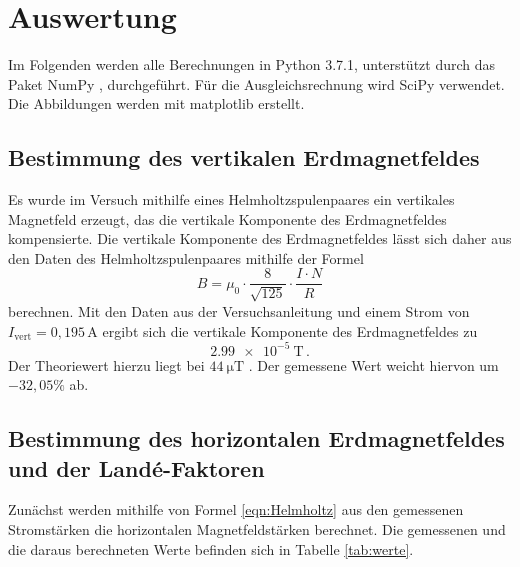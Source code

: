 \newpage
\section{Auswertung}
\label{sec:Auswertung}
Im Folgenden werden alle Berechnungen in Python 3.7.1, unterstützt durch das
Paket NumPy \cite{numpy}, durchgeführt. Für die Ausgleichsrechnung wird SciPy
\cite{scipy} verwendet. Die Abbildungen werden mit matplotlib \cite{matplotlib} erstellt.

\subsection{Bestimmung des vertikalen Erdmagnetfeldes}
\label{subsec:vertikal}

Es wurde im Versuch mithilfe eines Helmholtzspulenpaares ein vertikales Magnetfeld
erzeugt, das die vertikale Komponente des Erdmagnetfeldes kompensierte. Die vertikale
Komponente des Erdmagnetfeldes lässt sich daher aus den Daten des Helmholtzspulenpaares
mithilfe der Formel
\begin{equation}
    B= \mu_0 \cdot  \frac{8}{\sqrt {125}}\cdot \frac{I\cdot N}{R}
    \label{eqn:Helmholtz}
\end{equation}
berechnen. Mit den Daten aus der Versuchsanleitung \cite{Versuchsanleitung} und einem Strom von
$I_{\text{vert}}=0{,}195\,$A ergibt sich die vertikale Komponente des Erdmagnetfeldes zu
\begin{equation*}
  \SI{2.99e-5}{\tesla}\,.
\end{equation*}
Der Theoriewert hierzu liegt bei $\SI{44}{\micro\tesla}$ \cite{erde}. Der gemessene Wert
weicht hiervon um $-32{,}05\%$ ab.

\subsection{Bestimmung des horizontalen Erdmagnetfeldes und der Landé-Faktoren}
\label{subsec:horizontal}

Zunächst werden mithilfe von Formel \eqref{eqn:Helmholtz} aus den gemessenen Stromstärken
die horizontalen Magnetfeldstärken berechnet. Die gemessenen und die daraus berechneten Werte befinden sich
in Tabelle \ref{tab:werte}.

